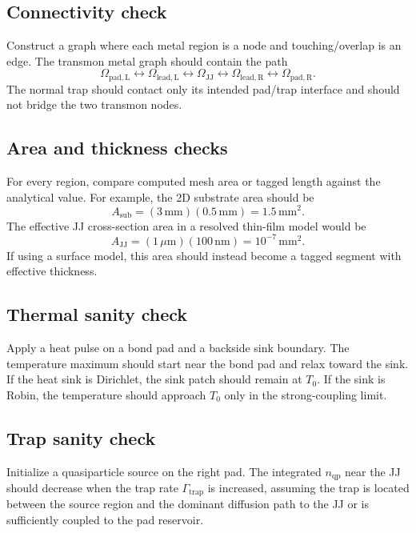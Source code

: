 \documentclass[11pt]{article}
\begin{document}
\subsection{Connectivity check}
Construct a graph where each metal region is a node and touching/overlap is an edge. The transmon metal graph should contain the path
\begin{equation}
    \Omega_{\mathrm{pad,L}} \leftrightarrow \Omega_{\mathrm{lead,L}} \leftrightarrow \Omega_{\mathrm{JJ}} \leftrightarrow \Omega_{\mathrm{lead,R}} \leftrightarrow \Omega_{\mathrm{pad,R}}.
\end{equation}
The normal trap should contact only its intended pad/trap interface and should not bridge the two transmon nodes.

\subsection{Area and thickness checks}
For every region, compare computed mesh area or tagged length against the analytical value. For example, the 2D substrate area should be
\begin{equation}
    A_{\mathrm{sub}} = (3\,\mathrm{mm})(0.5\,\mathrm{mm}) = 1.5\,\mathrm{mm}^2.
\end{equation}
The effective JJ cross-section area in a resolved thin-film model would be
\begin{equation}
    A_{\mathrm{JJ}} = (1\,\mu\mathrm{m})(100\,\mathrm{nm}) = 10^{-7}\,\mathrm{mm}^2.
\end{equation}
If using a surface model, this area should instead become a tagged segment with effective thickness.

\subsection{Thermal sanity check}
Apply a heat pulse on a bond pad and a backside sink boundary. The temperature maximum should start near the bond pad and relax toward the sink. If the heat sink is Dirichlet, the sink patch should remain at $T_0$. If the sink is Robin, the temperature should approach $T_0$ only in the strong-coupling limit.

\subsection{Trap sanity check}
Initialize a quasiparticle source on the right pad. The integrated $n_{\mathrm{qp}}$ near the JJ should decrease when the trap rate $\Gamma_{\mathrm{trap}}$ is increased, assuming the trap is located between the source region and the dominant diffusion path to the JJ or is sufficiently coupled to the pad reservoir.
\end{document}

